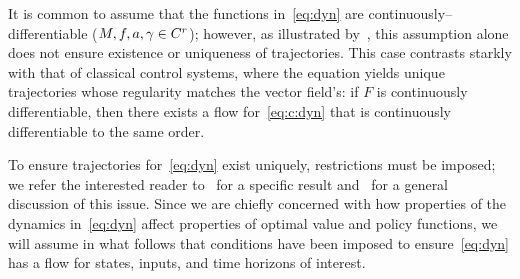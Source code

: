 \documentclass{article}
\begin{document}
It is common to assume that the functions in~\eqref{eq:dyn} are continuously--differentiable ($M, f, a, \gamma\in C^r$); however, as illustrated by~\cite[Ex.~2]{Ballard2000-ui}, this assumption alone does not ensure existence or uniqueness of trajectories.
This case contrasts starkly with that of classical 
control systems, where the equation
yields unique trajectories whose regularity matches the vector field's:
if $F$ is continuously differentiable,
then 
there exists a flow for~\eqref{eq:c:dyn} that is 
continuously differentiable to the same order.

To ensure trajectories for~\eqref{eq:dyn} exist uniquely, restrictions must be imposed; we refer the interested reader to~\cite[Thm.~10]{Ballard2000-ui} for a specific result and~\cite{Johnson2016-nh} for a general discussion of this issue.
Since we are chiefly concerned with how properties of the dynamics in~\eqref{eq:dyn} affect properties of optimal value and policy functions, 
we will assume in what follows that conditions have been imposed to ensure~\eqref{eq:dyn} has a flow for states, inputs, and time horizons of interest.
\end{document}
